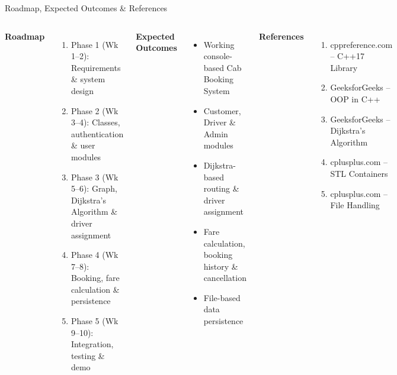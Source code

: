 \documentclass[aspectratio=169,11pt]{beamer}
\begin{document}
\begin{frame}{Roadmap, Expected Outcomes \& References}

\scriptsize
\vspace{-5mm}

\begin{columns}[T,totalwidth=\textwidth]


\textbf{\color{GEUBlue}Roadmap}

\begin{enumerate}
\setlength{\itemsep}{1pt}
\setlength{\parskip}{0pt}
\item Phase 1 (Wk 1--2): Requirements \& system design
\item Phase 2 (Wk 3--4): Classes, authentication \& user modules
\item Phase 3 (Wk 5--6): Graph, Dijkstra's Algorithm \& driver assignment
\item Phase 4 (Wk 7--8): Booking, fare calculation \& persistence
\item Phase 5 (Wk 9--10): Integration, testing \& demo
\end{enumerate}

\vspace{1 mm}

\textbf{\color{GEUBlue}Expected Outcomes}

\begin{itemize}
\setlength{\itemsep}{1pt}
\setlength{\parskip}{0pt}
\item Working console-based Cab Booking System
\item Customer, Driver \& Admin modules
\item Dijkstra-based routing \& driver assignment
\item Fare calculation, booking history \& cancellation
\item File-based data persistence
\end{itemize}


\textbf{\color{GEUBlue}References}

\begin{enumerate}
\setlength{\itemsep}{1pt}
\setlength{\parskip}{0pt}
\item cppreference.com -- C++17 Library
\item GeeksforGeeks -- OOP in C++
\item GeeksforGeeks -- Dijkstra's Algorithm
\item cplusplus.com -- STL Containers
\item cplusplus.com -- File Handling
\end{enumerate}


\end{columns}
\end{frame}
\end{document}
